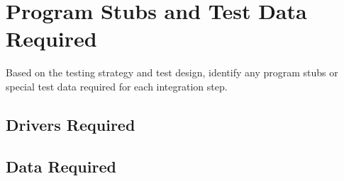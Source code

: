 \section{Program Stubs and Test Data Required}

Based on the testing strategy and test design, identify any program stubs or special test data required for each integration step.

\subsection{Drivers Required}

\subsection{Data Required}
